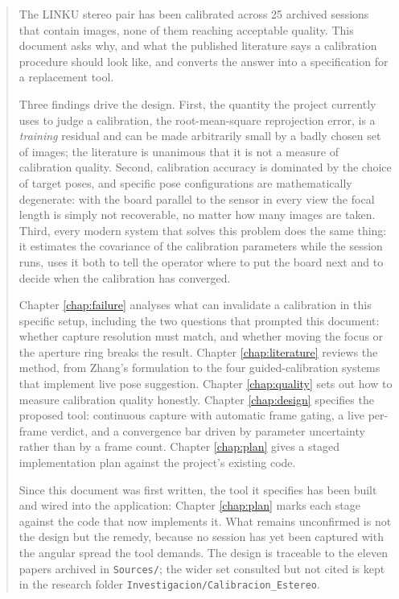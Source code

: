 \documentclass[a4paper, twoside]{report}
\begin{document}


\begin{abstract}
The LINKU stereo pair has been calibrated across 25 archived sessions that contain images, none of them reaching acceptable quality. This document asks why, and what the published literature says a calibration procedure should look like, and converts the answer into a specification for a replacement tool.

Three findings drive the design. First, the quantity the project currently uses to judge a calibration, the root-mean-square reprojection error, is a \emph{training} residual and can be made arbitrarily small by a badly chosen set of images; the literature is unanimous that it is not a measure of calibration quality. Second, calibration accuracy is dominated by the choice of target poses, and specific pose configurations are mathematically degenerate: with the board parallel to the sensor in every view the focal length is simply not recoverable, no matter how many images are taken. Third, every modern system that solves this problem does the same thing: it estimates the covariance of the calibration parameters while the session runs, uses it both to tell the operator where to put the board next and to decide when the calibration has converged.

Chapter \ref{chap:failure} analyses what can invalidate a calibration in this specific setup, including the two questions that prompted this document: whether capture resolution must match, and whether moving the focus or the aperture ring breaks the result. Chapter \ref{chap:literature} reviews the method, from Zhang's formulation to the four guided-calibration systems that implement live pose suggestion. Chapter \ref{chap:quality} sets out how to measure calibration quality honestly. Chapter \ref{chap:design} specifies the proposed tool: continuous capture with automatic frame gating, a live per-frame verdict, and a convergence bar driven by parameter uncertainty rather than by a frame count. Chapter \ref{chap:plan} gives a staged implementation plan against the project's existing code.

Since this document was first written, the tool it specifies has been built and wired into the application: Chapter \ref{chap:plan} marks each stage against the code that now implements it. What remains unconfirmed is not the design but the remedy, because no session has yet been captured with the angular spread the tool demands. The design is traceable to the eleven papers archived in \texttt{Sources/}; the wider set consulted but not cited is kept in the research folder \texttt{Investigacion/\allowbreak Calibracion\_Estereo}.
\end{abstract}

\tableofcontents
\listoffigures
\listoftables











\end{document}
